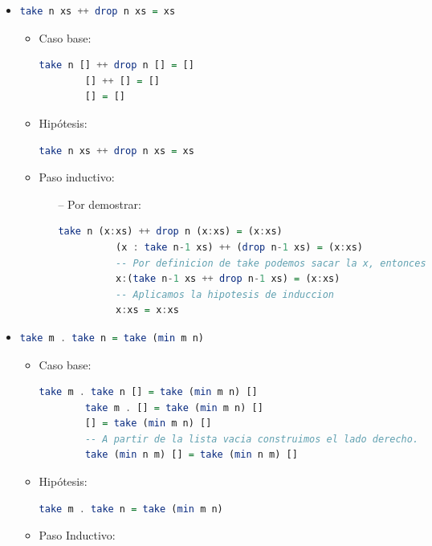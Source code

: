\documentclass[spanish,12pt,letterpaper]{article}
\begin{document}
  \begin{itemize}
  \item
    \begin{lstlisting}[language=Haskell]
      take n xs ++ drop n xs = xs \end{lstlisting}
    \begin{itemize}
    \item Caso base: \\
      \begin{lstlisting}[language=Haskell]
        take n [] ++ drop n [] = []
        [] ++ [] = []
        [] = [] \end{lstlisting}

    \item Hipótesis:
      \begin{lstlisting}[language=Haskell]
        take n xs ++ drop n xs = xs \end{lstlisting}

    \item Paso inductivo:
      \begin{itemize}
      \item[--] Por demostrar:
	\begin{lstlisting}[language=Haskell]
          take n (x:xs) ++ drop n (x:xs) = (x:xs)
          (x : take n-1 xs) ++ (drop n-1 xs) = (x:xs)
          -- Por definicion de take podemos sacar la x, entonces
          x:(take n-1 xs ++ drop n-1 xs) = (x:xs)
          -- Aplicamos la hipotesis de induccion
          x:xs = x:xs  	\end{lstlisting}
      \end{itemize}
    \end{itemize}

  \item
    \begin{lstlisting}[language=Haskell]
      take m . take n = take (min m n)\end{lstlisting}
    \begin{itemize}
    \item Caso base:
      \begin{lstlisting}[language=Haskell]
        take m . take n [] = take (min m n) []
        take m . [] = take (min m n) []
        [] = take (min m n) []
        -- A partir de la lista vacia construimos el lado derecho.
        take (min n m) [] = take (min n m) []
      \end{lstlisting}
    \item Hipótesis:
      \begin{lstlisting}[language=Haskell]
        take m . take n = take (min m n)
      \end{lstlisting}
    \item Paso Inductivo:\\


\end{itemize}
\end{itemize}
\end{document}
